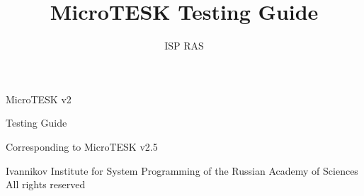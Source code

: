 \documentclass[12pt,letterpaper,extrafontsizes]{memoir}
\title{MicroTESK Testing Guide}
\author{ISP RAS}
\begin{document}

\frontmatter

\pagestyle{empty}


\vspace*{\fill}
\begin{center}
\HUGE\textsf{MicroTESK v2}\par
\end{center}

\begin{center}
\Huge\textsf{Testing Guide}\par
\end{center}

\begin{center}
\normalsize\textsf{Corresponding to MicroTESK v2.5}\par
\end{center}

\vspace*{\fill}
\clearpage


\begingroup
\footnotesize
\setlength{\parindent}{0pt}
\setlength{\parskip}{\baselineskip}
\textcopyright{} Ivannikov Institute for System Programming of the Russian Academy of Sciences\\
All rights reserved
\endgroup
\clearpage


\pagestyle{headings}

\tableofcontents

\end{document}
